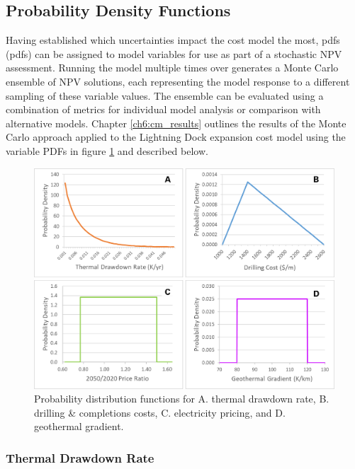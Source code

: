\subsection{Probability Density Functions}

Having established which uncertainties impact the cost model the most, \acrlong{pdf}s (\acrshort{pdf}s) can be assigned to model variables for use as part of a stochastic NPV assessment. Running the model multiple times over generates a Monte Carlo ensemble of NPV solutions, each representing the model response to a different sampling of these variable values. The ensemble can be evaluated using a combination of metrics for individual model analysis or comparison with alternative models. Chapter \ref{ch6:cm_results} outlines the results of the Monte Carlo approach applied to the Lightning Dock expansion cost model using the variable PDFs in figure \ref{fig:cm_probdists} and described below.

\begin{figure}[htp]
\centering
\includegraphics[width=.85\textwidth]{templates/images/Figure-ProbDists.png}
\singlespacing
\caption[Cost model probability distributions]{Probability distribution functions for A. thermal drawdown rate, B. drilling \& completions costs, C. electricity pricing, and D. geothermal gradient.}
\label{fig:cm_probdists}
\end{figure}

\subsubsection{Thermal Drawdown Rate}
\label{cm4:prob_tdr}

